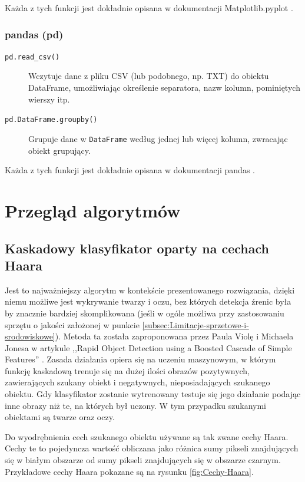 \documentclass[a4paper,twoside,12pt]{book}
\begin{document}
Każda z tych funkcji jest dokładnie opisana w dokumentacji Matplotlib.pyplot \cite{bib:matplotlib-pyplot-funkcje}.

\subsubsection{pandas (pd)}

\begin{description}
	\item[\texttt{pd.read\_csv()}] Wczytuje dane z pliku CSV (lub podobnego, np. TXT) do obiektu DataFrame, umożliwiając określenie separatora, nazw kolumn, pominiętych wierszy itp.
	\item[\texttt{pd.DataFrame.groupby()}] Grupuje dane w \texttt{DataFrame} według jednej lub więcej kolumn, zwracając obiekt grupujący.
\end{description}

Każda z tych funkcji jest dokładnie opisana w dokumentacji pandas \cite{bib:pandas-funkcje}.

\section{Przegląd algorytmów}
\label{sec:Przegląd-algorytmow}

\subsection{Kaskadowy klasyfikator oparty na cechach Haara}
\label{subsec:kaskadowy-klasyfikator-Haara}

Jest to najważniejszy algorytm w kontekście prezentowanego rozwiązania, dzięki niemu możliwe jest wykrywanie twarzy i oczu, bez których detekcja źrenic była by znacznie bardziej skomplikowana (jeśli w ogóle możliwa przy zastosowaniu sprzętu o jakości założonej w punkcie \ref{subsec:Limitacje-sprzetowe-i-srodowiskowe}). Metoda ta została zaproponowana przez Paula Violę i Michaela Jonesa w artykule ,,Rapid Object Detection using a Boosted Cascade of Simple Features'' \cite{bib:Rapid-object-detection}. Zasada działania opiera się na uczeniu maszynowym, w którym funkcję kaskadową trenuje się na dużej ilości obrazów pozytywnych, zawierających szukany obiekt i negatywnych, nieposiadających szukanego obiektu. Gdy klasyfikator zostanie wytrenowany testuje się jego działanie podając inne obrazy niż te, na których był uczony. W tym przypadku szukanymi obiektami są twarze oraz oczy.

Do wyodrębnienia cech szukanego obiektu używane są tak zwane cechy Haara. Cechy te to pojedyncza wartość obliczana jako różnica sumy pikseli znajdujących się w białym obszarze od sumy pikseli znajdujących się w obszarze czarnym. Przykładowe cechy Haara pokazane są na rysunku \ref{fig:Cechy-Haara}.
\end{document}

